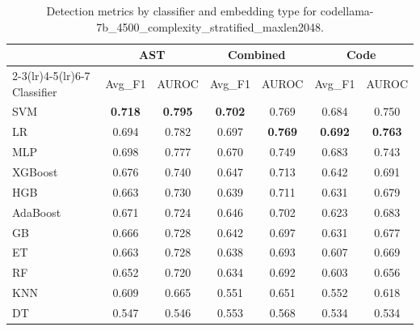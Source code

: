 \begin{table}[t]
\centering
\caption{Detection metrics by classifier and embedding type for codellama-7b\_4500\_complexity\_stratified\_maxlen2048.}
\label{tab:rq2d_codellama-7b_4500_complexity_stratified_maxlen2048}
\begin{tabular}{l cc cc cc}
\toprule
 & \multicolumn{2}{c}{AST} & \multicolumn{2}{c}{Combined} & \multicolumn{2}{c}{Code} \\
\cmidrule(lr){2-3}\cmidrule(lr){4-5}\cmidrule(lr){6-7}
Classifier & Avg\_F1 & AUROC & Avg\_F1 & AUROC & Avg\_F1 & AUROC \\
\midrule
SVM & \textbf{0.718} & \textbf{0.795} & \textbf{0.702} & 0.769 & 0.684 & 0.750 \\
LR & 0.694 & 0.782 & 0.697 & \textbf{0.769} & \textbf{0.692} & \textbf{0.763} \\
MLP & 0.698 & 0.777 & 0.670 & 0.749 & 0.683 & 0.743 \\
XGBoost & 0.676 & 0.740 & 0.647 & 0.713 & 0.642 & 0.691 \\
HGB & 0.663 & 0.730 & 0.639 & 0.711 & 0.631 & 0.679 \\
AdaBoost & 0.671 & 0.724 & 0.646 & 0.702 & 0.623 & 0.683 \\
GB & 0.666 & 0.728 & 0.642 & 0.697 & 0.631 & 0.677 \\
ET & 0.663 & 0.728 & 0.638 & 0.693 & 0.607 & 0.669 \\
RF & 0.652 & 0.720 & 0.634 & 0.692 & 0.603 & 0.656 \\
KNN & 0.609 & 0.665 & 0.551 & 0.651 & 0.552 & 0.618 \\
DT & 0.547 & 0.546 & 0.553 & 0.568 & 0.534 & 0.534 \\
\bottomrule
\end{tabular}
\end{table}
